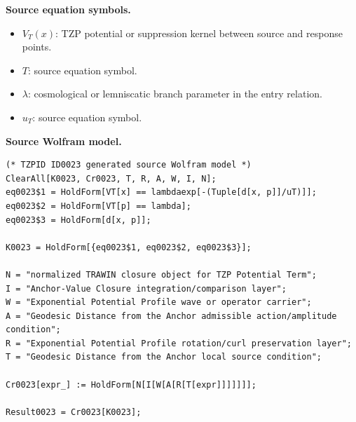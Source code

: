 \begin{minipage}[t]{0.49\linewidth}
\begingroup
\small
\raggedright
\textbf{Source equation symbols.}\par
\begin{itemize}[leftmargin=1.35em,itemsep=1pt,topsep=1pt,parsep=0pt]
    \item $V_{T}(x)$: TZP potential or suppression kernel between source and response points.
    \item $T$: source equation symbol.
    \item $\lambda$: cosmological or lemniscatic branch parameter in the entry relation.
    \item $u_{T}$: source equation symbol.
\end{itemize}
\endgroup
\end{minipage}\hfill
\begin{minipage}[t]{0.47\linewidth}
\begingroup
\scriptsize
\raggedright
\textbf{Source Wolfram model.}\par
\begin{Verbatim}[fontsize=\tiny,breaklines=true,breakanywhere=true]
(* TZPID ID0023 generated source Wolfram model *)
ClearAll[K0023, Cr0023, T, R, A, W, I, N];
eq0023$1 = HoldForm[VT[x] == lambdaexp[-(Tuple[d[x, p]]/uT)]];
eq0023$2 = HoldForm[VT[p] == lambda];
eq0023$3 = HoldForm[d[x, p]];

K0023 = HoldForm[{eq0023$1, eq0023$2, eq0023$3}];

N = "normalized TRAWIN closure object for TZP Potential Term";
I = "Anchor-Value Closure integration/comparison layer";
W = "Exponential Potential Profile wave or operator carrier";
A = "Geodesic Distance from the Anchor admissible action/amplitude condition";
R = "Exponential Potential Profile rotation/curl preservation layer";
T = "Geodesic Distance from the Anchor local source condition";

Cr0023[expr_] := HoldForm[N[I[W[A[R[T[expr]]]]]]];

Result0023 = Cr0023[K0023];
\end{Verbatim}
\endgroup
\end{minipage}


